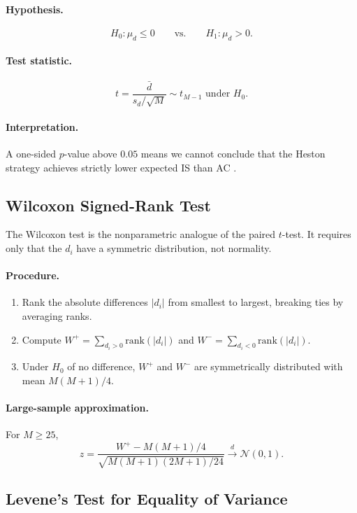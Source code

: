 \documentclass[11pt]{article}
\begin{document}
\paragraph{Hypothesis.}
\[
H_0: \mu_d \leq 0 \qquad \text{vs.} \qquad H_1: \mu_d > 0.
\]

\paragraph{Test statistic.}
\[
t = \frac{\bar{d}}{s_d/\sqrt{M}} \sim t_{M-1} \text{ under } H_0.
\]

\paragraph{Interpretation.} A one-sided $p$-value above $0.05$ means we cannot conclude that the Heston strategy achieves strictly lower expected IS than AC \cite{lehmann2005testing}.

\subsection{Wilcoxon Signed-Rank Test}

The Wilcoxon test \cite{lehmann2005testing} is the nonparametric analogue of the paired $t$-test. It requires only that the $d_i$ have a symmetric distribution, not normality.

\paragraph{Procedure.}
\begin{enumerate}[label=(\roman*)]
\item Rank the absolute differences $|d_i|$ from smallest to largest, breaking ties by averaging ranks.
\item Compute $W^+ = \sum_{d_i > 0} \mathrm{rank}(|d_i|)$ and $W^- = \sum_{d_i < 0} \mathrm{rank}(|d_i|)$.
\item Under $H_0$ of no difference, $W^+$ and $W^-$ are symmetrically distributed with mean $M(M+1)/4$.
\end{enumerate}

\paragraph{Large-sample approximation.} For $M \geq 25$,
\[
z = \frac{W^+ - M(M+1)/4}{\sqrt{M(M+1)(2M+1)/24}} \overset{d}{\to} \mathcal{N}(0,1).
\]

\subsection{Levene's Test for Equality of Variance}
\end{document}
